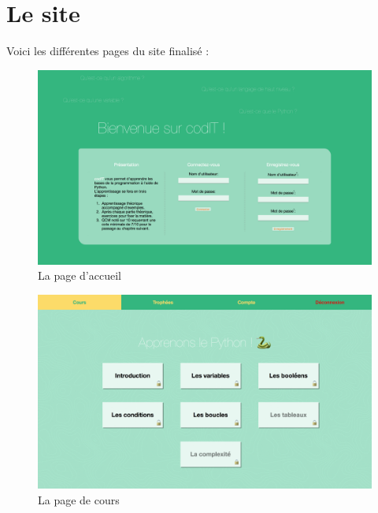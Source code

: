 \section*{Le site}
\label{sec:site}

Voici les différentes pages du site finalisé :

\begin{figure}[!h]
    \centering
    \includegraphics[scale=0.14]{textures/images/annexes/site/1-Login.png}
    \caption{La page d'accueil}
\end{figure}
\begin{figure}[!h]
    \centering
    \includegraphics[scale=0.14]{textures/images/annexes/site/21-Sommaire.png}
    \caption{La page de cours}
\end{figure}

\newpage

